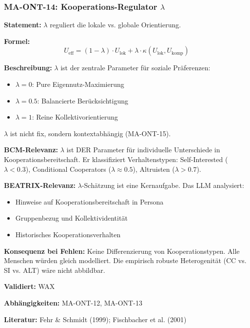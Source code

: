 \subsubsection*{MA-ONT-14: Kooperations-Regulator $\lambda$}

\textbf{Statement:} $\lambda$ reguliert die lokale vs. globale Orientierung.

\textbf{Formel:}
\begin{equation}
U_{\text{eff}} = (1-\lambda) \cdot U_{\text{lok}} + \lambda \cdot \kappa(U_{\text{lok}}, U_{\text{komp}})
\end{equation}

\textbf{Beschreibung:}
$\lambda$ ist der zentrale Parameter für soziale Präferenzen:
\begin{itemize}
    \item $\lambda = 0$: Pure Eigennutz-Maximierung
    \item $\lambda = 0.5$: Balancierte Berücksichtigung
    \item $\lambda = 1$: Reine Kollektivorientierung
\end{itemize}
$\lambda$ ist nicht fix, sondern kontextabhängig (MA-ONT-15).

\textbf{BCM-Relevanz:}
$\lambda$ ist DER Parameter für individuelle Unterschiede in Kooperationsbereitschaft. Er klassifiziert Verhaltenstypen: Self-Interested ($\lambda < 0.3$), Conditional Cooperators ($\lambda \approx 0.5$), Altruisten ($\lambda > 0.7$).

\textbf{BEATRIX-Relevanz:}
$\lambda$-Schätzung ist eine Kernaufgabe. Das LLM analysiert:
\begin{itemize}
    \item Hinweise auf Kooperationsbereitschaft in Persona
    \item Gruppenbezug und Kollektividentität
    \item Historisches Kooperationsverhalten
\end{itemize}

\textbf{Konsequenz bei Fehlen:}
Keine Differenzierung von Kooperationstypen. Alle Menschen würden gleich modelliert. Die empirisch robuste Heterogenität (CC vs. SI vs. ALT) wäre nicht abbildbar.

\textbf{Validiert:} WAX

\textbf{Abhängigkeiten:} MA-ONT-12, MA-ONT-13

\textbf{Literatur:} Fehr \& Schmidt (1999); Fischbacher et al. (2001)


